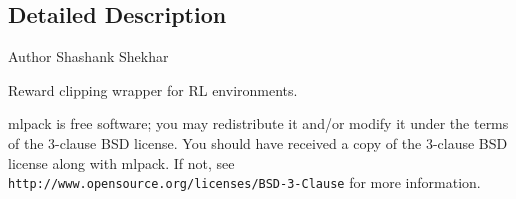 \subsection{Detailed Description}
\begin{DoxyAuthor}{Author}
Shashank Shekhar
\end{DoxyAuthor}
Reward clipping wrapper for RL environments.

mlpack is free software; you may redistribute it and/or modify it under the terms of the 3-\/clause B\+SD license. You should have received a copy of the 3-\/clause B\+SD license along with mlpack. If not, see {\tt http\+://www.\+opensource.\+org/licenses/\+B\+S\+D-\/3-\/\+Clause} for more information. 